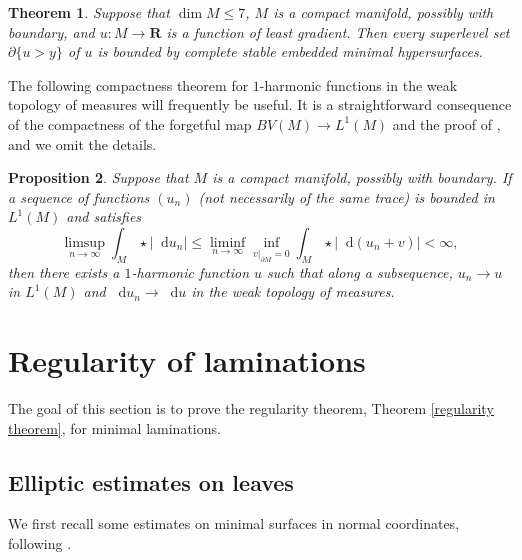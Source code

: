 \documentclass[reqno,11pt]{amsart}
\newcommand{\RR}{\mathbf{R}}
\newcommand*\dif{\mathop{}\!\mathrm{d}}
\newtheorem{theorem}{Theorem}[section]
\newtheorem{proposition}[theorem]{Proposition}
\theoremstyle{definition}
\numberwithin{equation}{section}
\begin{document}
\begin{theorem}\label{main thm of old paper}
Suppose that $\dim M \leq 7$, $M$ is a compact manifold, possibly with boundary, and $u: M \to \RR$ is a function of least gradient.
Then every superlevel set $\partial \{u > y\}$ of $u$ is bounded by complete stable embedded minimal hypersurfaces.
\end{theorem}

The following compactness theorem for $1$-harmonic functions in the weak topology of measures will frequently be useful.
It is a straightforward consequence of the compactness of the forgetful map $BV(M) \to L^1(M)$ and the proof of \cite[Osservazione 3]{Miranda67}, and we omit the details.

\begin{proposition}\label{MirandaStability}
  Suppose that $M$ is a compact manifold, possibly with boundary.
	If a sequence of functions $(u_n)$ (not necessarily of the same trace) is bounded in $L^1(M)$ and satisfies
\begin{equation}\label{boundedness in Miranda}
	\limsup_{n \to \infty} \int_M \star |\dif u_n| \leq \liminf_{n \to \infty} \inf_{v|_{\partial M} = 0} \int_M \star |\dif(u_n + v)| < \infty,
\end{equation}
	then there exists a $1$-harmonic function $u$ such that along a subsequence, $u_n \to u$ in $L^1(M)$ and $\dif u_n \to \dif u$ in the weak topology of measures.
\end{proposition}

\section{Regularity of laminations}\label{Regularity}
The goal of this section is to prove the regularity theorem, Theorem \ref{regularity theorem}, for minimal laminations.

\subsection{Elliptic estimates on leaves}\label{Leaf estimates}
We first recall some estimates on minimal surfaces in normal coordinates, following \cite[\S7.1]{colding2011course}.
\end{document}
